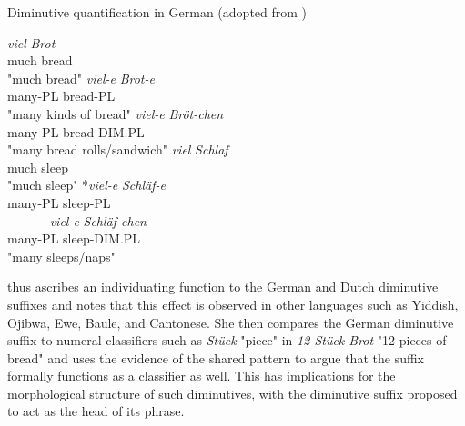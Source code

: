 \begin{exe}
\ex \label{ex:mass-to-count-to-kind-to-item} 
Diminutive quantification in German (adopted from \citeauthor{Wiltschko+2006} \citeyear{Wiltschko+2006})
\begin{multicols}{2}
\begin{xlist}
\ex \gll
\textit{viel} \textit{Brot}\\
much bread\\
\trans "much bread"
\ex \gll
\textit{viel-e} \textit{Brot-e}\\
many-PL bread-PL\\
\trans "many kinds of bread"
\ex \gll
\textit{viel-e} \textit{Bröt-chen}\\
many-PL bread-DIM.PL\\
\trans "many bread rolls/sandwich"
\columnbreak
\ex \gll
\textit{viel} \textit{Schlaf}\\
much sleep\\
\trans "much sleep"
\ex \gll
*\textit{viel-e} \textit{Schläf-e}\\
many-PL sleep-PL\\
\trans ~~~~~~
\ex \gll
\textit{viel-e} \textit{Schläf-chen}\\
many-PL sleep-DIM.PL\\
\trans "many sleeps/naps"
\end{xlist}
\end{multicols}
\end{exe}

\citeauthor{Wiltschko+2006} thus ascribes an individuating function to the German and Dutch diminutive suffixes and notes that this effect is observed in other languages such as Yiddish, Ojibwa, Ewe, Baule, and Cantonese. She then compares the German diminutive suffix to numeral classifiers such as \textit{Stück} "piece" in \textit{12 Stück Brot} "12 pieces of bread" and uses the evidence of the shared pattern to argue that the suffix formally functions as a classifier as well. This has implications for the morphological structure of such diminutives, with the diminutive suffix proposed to act as the head of its phrase.

